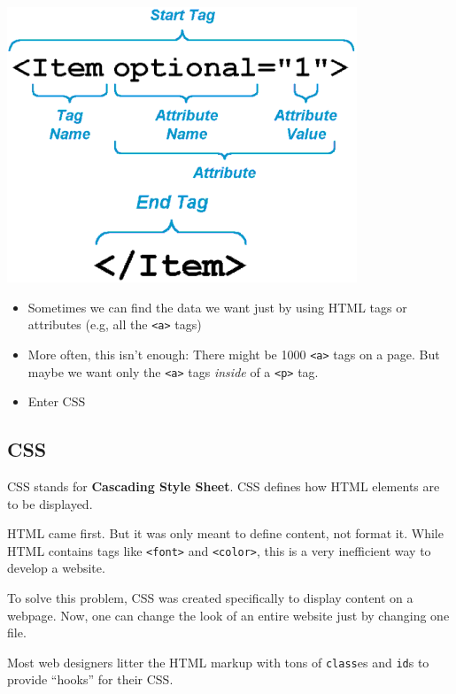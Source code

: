 \documentclass[]{book}
\providecommand{\tightlist}{%
  \setlength{\itemsep}{0pt}\setlength{\parskip}{0pt}}
\begin{document}
\begin{center}\includegraphics[width=0.7\linewidth]{img/html-attributes} \end{center}

\begin{itemize}
\tightlist
\item
  Sometimes we can find the data we want just by using HTML tags or attributes (e.g, all the \texttt{\textless{}a\textgreater{}} tags)
\item
  More often, this isn't enough: There might be 1000 \texttt{\textless{}a\textgreater{}} tags on a page. But maybe we want only the \texttt{\textless{}a\textgreater{}} tags \emph{inside} of a \texttt{\textless{}p\textgreater{}} tag.
\item
  Enter CSS
\end{itemize}

\hypertarget{css}{%
\subsection{CSS}\label{css}}

CSS stands for \textbf{Cascading Style Sheet}. CSS defines how HTML elements are to be displayed.

HTML came first. But it was only meant to define content, not format it. While HTML contains tags like \texttt{\textless{}font\textgreater{}} and \texttt{\textless{}color\textgreater{}}, this is a very inefficient way to develop a website.

To solve this problem, CSS was created specifically to display content on a webpage. Now, one can change the look of an entire website just by changing one file.

Most web designers litter the HTML markup with tons of \texttt{class}es and \texttt{id}s to provide ``hooks'' for their CSS.
\end{document}
